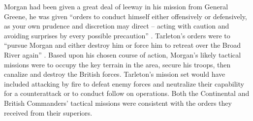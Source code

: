 Morgan had been given a great deal of leeway in his mission from General Greene,
he was given “orders to conduct himself either offensively or defensively, as
your own prudence and discretion may direct – acting with caution and avoiding
surprises by every possible precaution” \cite[27]{weigley_partisan_1970}. Tarleton’s orders were
to “pursue Morgan and either destroy him or force him to retreat over the Broad
River again” \cite[30]{fleming_cowpens_1988}. Based upon his chosen course of action, Morgan’s
likely tactical missions were to occupy the key terrain in the area, secure his
troops, then canalize and destroy the British forces.  Tarleton’s mission set
would have included attacking by fire to defeat enemy forces and neutralize
their capability for a counterattack or to conduct follow on operations.  Both
the Continental and British Commanders’ tactical missions were consistent with
the orders they received from their superiors.  
